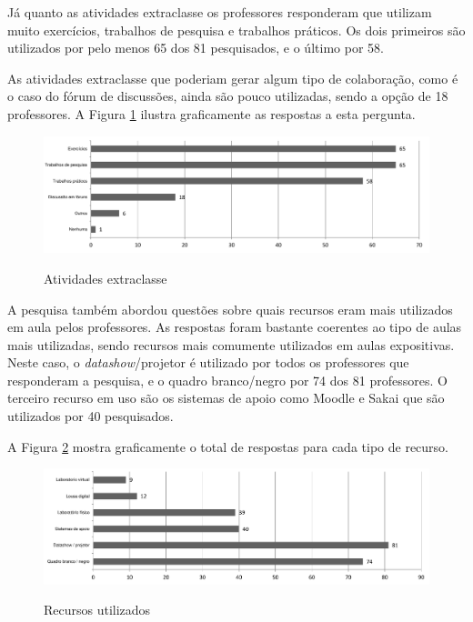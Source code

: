 Já quanto as atividades extraclasse os professores responderam que utilizam muito exercícios, trabalhos de pesquisa e trabalhos práticos. Os dois primeiros são utilizados por pelo menos 65 dos 81 pesquisados, e o último por 58. 

As atividades extraclasse que poderiam gerar algum tipo de colaboração, como é o caso do fórum de discussões, ainda são pouco utilizadas, sendo a opção de 18 professores. A Figura \ref{fig:grafico_atividades_extra_classe} ilustra graficamente as respostas a esta pergunta.

 
\begin{figure}
\centering
\caption{Atividades extraclasse}
\includegraphics[width=1.0\textwidth]{pdfs/professores/img-grafico-extra-classe.pdf} 
\label{fig:grafico_atividades_extra_classe} 
\end{figure}



A pesquisa também abordou questões sobre quais recursos eram mais utilizados em aula pelos professores. As respostas foram bastante coerentes ao tipo de aulas mais utilizadas, sendo recursos mais comumente utilizados em aulas expositivas. Neste caso, o \emph{datashow}/projetor é utilizado por todos os professores que responderam a pesquisa, e o quadro branco/negro por 74 dos 81 professores. O terceiro recurso em uso são os sistemas de apoio como Moodle e Sakai que são utilizados por 40 pesquisados.

A Figura \ref{fig:grafico_recursos} mostra graficamente o total de respostas para cada tipo de recurso.
 
\begin{figure}
\centering
\caption{Recursos utilizados}
\includegraphics[width=1.0\textwidth]{pdfs/professores/img-grafico-recursos.pdf} 
\label{fig:grafico_recursos} 
\end{figure}

